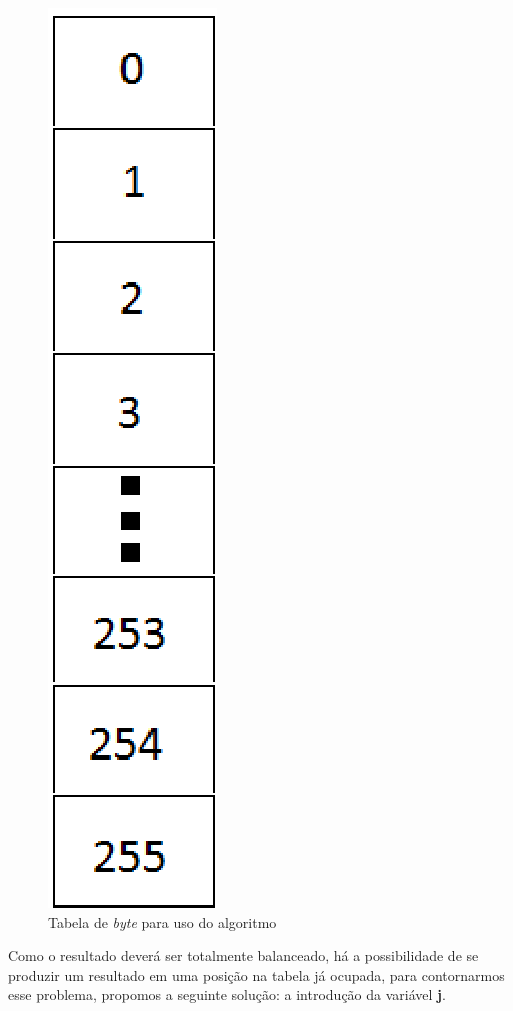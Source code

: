 \begin{figure}[h]
	\centering
	\includegraphics[scale=0.7]{figuras/tabela.eps}
	\caption{Tabela de \textit{byte} para uso do algoritmo}
\end{figure}

Como o resultado deverá ser totalmente balanceado, há a possibilidade de se produzir um resultado em uma posição na tabela já ocupada, para contornarmos esse problema, propomos a seguinte solução: a introdução da variável \textbf{j}.

